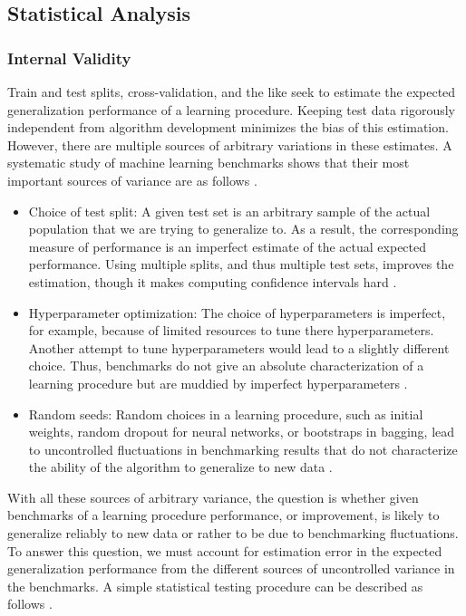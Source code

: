 \documentclass[../../../main.tex]{subfiles}
\begin{document}
\subsection{Statistical Analysis}

\subsubsection{Internal Validity}

Train and test splits, cross-validation, and the like seek to estimate the expected generalization performance of a learning procedure. Keeping test data rigorously independent from algorithm development minimizes the bias of this estimation. However, there are multiple sources of arbitrary variations in these estimates. A systematic study of machine learning benchmarks shows that their most important sources of variance are as follows \autocite{Varoquaux2023}.

\begin{itemize}
\item Choice of test split: A given test set is an arbitrary sample of the actual population that we are trying to generalize to. As a result, the corresponding measure of performance is an imperfect estimate of the actual expected performance. Using multiple splits, and thus multiple test sets, improves the estimation, though it makes computing confidence intervals hard \autocite{Varoquaux2023}.

\item Hyperparameter optimization: The choice of hyperparameters is imperfect, for example, because of limited resources to tune there hyperparameters. Another attempt to tune hyperparameters would lead to a slightly different choice. Thus, benchmarks do not give an absolute characterization of a learning procedure but are muddied by imperfect hyperparameters \autocite{Varoquaux2023}.

\item Random seeds: Random choices in a learning procedure, such as initial weights, random dropout for neural networks, or bootstraps in bagging, lead to uncontrolled fluctuations in benchmarking results that do not characterize the ability of the algorithm to generalize to new data \autocite{Varoquaux2023}.
\end{itemize}

With all these sources of arbitrary variance, the question is whether given benchmarks of a learning procedure performance, or improvement, is likely to generalize reliably to new data or rather to be due to benchmarking fluctuations. To answer this question, we must account for estimation error in the expected generalization performance from the different sources of uncontrolled variance in the benchmarks. A simple statistical testing procedure can be described as follows \autocite{Varoquaux2023}.
\end{document}

